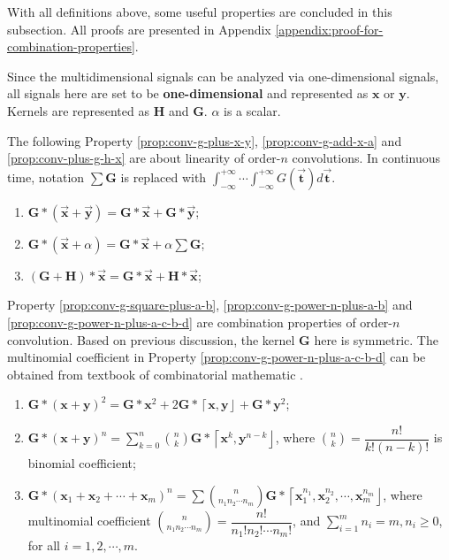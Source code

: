 \documentclass[twoside,11pt]{article}
\def\tvar#1{\mathbf{#1}} %
\def\vsymb#1{\vec{\mathbf{#1}}}
\def\isintinf{\int_{-\infty}^{+\infty}\!\!\!\cdots\!\int_{-\infty}^{+\infty}\!}
\def\lcerfl#1{\left\lceil{#1}\right\rfloor}
\begin{document}
With all definitions above, some useful properties are concluded in this subsection.
All proofs are presented in Appendix \ref{appendix:proof-for-combination-properties}.

Since the multidimensional signals can be analyzed via one-dimensional signals, all signals here are set to be \textbf{one-dimensional} and represented as \(\tvar{x}\) or \(\tvar{y}\). Kernels are represented as \(\tvar{H}\) and \(\tvar{G}\). \(\alpha\) is a scalar.


The following Property \ref{prop:conv-g-plus-x-y}, \ref{prop:conv-g-add-x-a} and \ref{prop:conv-plus-g-h-x} are about linearity of order-\(n\) convolutions.
In continuous time, notation \(\sum \tvar{G}\) is replaced with \(\isintinf G(\vsymb{t}) d \vsymb{t}\).

\begin{enumerate}%
  \item \label{prop:conv-g-plus-x-y} %
        \(\tvar{G} * (\vsymb{x} + \vsymb{y}) = \tvar{G} * \vsymb{x} + \tvar{G} * \vsymb{y}\);
  \item \label{prop:conv-g-add-x-a} %
        \(\tvar{G} * (\vsymb{x} + \alpha) = \tvar{G} * \vsymb{x} + \alpha \sum \tvar{G}\);
  \item \label{prop:conv-plus-g-h-x} %
        \((\tvar{G} + \tvar{H}) * \vsymb{x} = \tvar{G} * \vsymb{x} + \tvar{H} * \vsymb{x}\);
\end{enumerate}



Property \ref{prop:conv-g-square-plus-a-b}, \ref{prop:conv-g-power-n-plus-a-b} and \ref{prop:conv-g-power-n-plus-a-c-b-d} are combination properties of order-\(n\) convolution. Based on previous discussion, the kernel \(\tvar{G}\) here is symmetric.
The multinomial coefficient in Property \ref{prop:conv-g-power-n-plus-a-c-b-d} can be obtained from textbook of combinatorial mathematic \citep{brualdi_2004}.

\begin{enumerate}[resume]
  \item \label{prop:conv-g-square-plus-a-b} %
        \(\tvar{G} * (\tvar{x} + \tvar{y})^2 = \tvar{G} * \tvar{x}^2 + 2 \tvar{G} * \lcerfl{\tvar{x}, \tvar{y}} + \tvar{G} * \tvar{y}^2\);
  \item \label{prop:conv-g-power-n-plus-a-b} %
        \(\tvar{G} * (\tvar{x} + \tvar{y})^n = \sum_{k=0}^{n} \binom{n}{k} \tvar{G} * \lcerfl{\tvar{x}^k, \tvar{y}^{n-k}}\), where \(\binom{n}{k} = \dfrac{n!}{k! (n-k)!}\) is binomial coefficient;
  \item \label{prop:conv-g-power-n-plus-a-c-b-d}%
        \(\tvar{G} * (\tvar{x}_1 + \tvar{x}_2 + \cdots + \tvar{x}_m)^n = \sum \binom{n}{n_1 n_2 \cdots n_m} \tvar{G} * \lcerfl{\tvar{x}_1^{n_1}, \tvar{x}_2^{n_2}, \cdots, \tvar{x}_m^{n_m}} \), where multinomial coefficient \(\binom{n}{n_1 n_2 \cdots n_m} = \dfrac{n!}{n_1! n_2! \cdots n_m!}\), and \(\sum_{i=1}^{m} n_i = m, n_i \ge 0\), for all \(i = 1, 2, \cdots, m\).
\end{enumerate}
\end{document}
